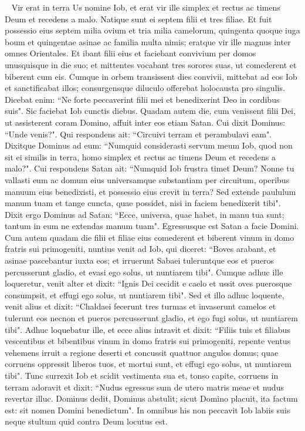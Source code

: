 
\begin{biblechapter}   
\verse Vir erat in terra Us nomine Iob, et erat vir ille simplex et rectus ac timens Deum et recedens a malo. 
\verse Natique sunt ei septem filii et tres filiae. 
\verse Et fuit possessio eius septem milia ovium et tria milia camelorum, quingenta quoque iuga boum et quingentae asinae ac familia multa nimis; eratque vir ille magnus inter omnes Orientales. 
\verse Et ibant filii eius et faciebant convivium per domos unusquisque in die suo; et mittentes vocabant tres sorores suas, ut comederent et biberent cum eis.  
\verse Cumque in orbem transissent dies convivii, mittebat ad eos Iob et sanctificabat illos; consurgensque diluculo offerebat holocausta pro singulis. Dicebat enim: “Ne forte peccaverint filii mei et benedixerint Deo in cordibus suis". Sic faciebat Iob cunctis diebus. 
\verse Quadam autem die, cum venissent filii Dei, ut assisterent coram Domino, affuit inter eos etiam Satan. 
\verse Cui dixit Dominus: “Unde venis?". Qui respondens ait: “Circuivi terram et perambulavi eam". 
\verse Dixitque Dominus ad eum: “Numquid considerasti servum meum Iob, quod non sit ei similis in terra, homo simplex et rectus ac timens Deum et recedens a malo?". 
\verse Cui respondens Satan ait: “Numquid Iob frustra timet Deum? 
\verse Nonne tu vallasti eum ac domum eius universamque substantiam per circuitum, operibus manuum eius benedixisti, et possessio eius crevit in terra? 
\verse Sed extende paululum manum tuam et tange cuncta, quae possidet, nisi in faciem benedixerit tibi". 
\verse Dixit ergo Dominus ad Satan: “Ecce, universa, quae habet, in manu tua sunt; tantum in eum ne extendas manum tuam". Egressusque est Satan a facie Domini. 
\verse Cum autem quadam die filii et filiae eius comederent et biberent vinum in domo fratris sui primogeniti, 
\verse nuntius venit ad Iob, qui diceret: “Boves arabant, et asinae pascebantur iuxta eos; 
\verse et irruerunt Sabaei tuleruntque eos et pueros percusserunt gladio, et evasi ego solus, ut nuntiarem tibi". 
\verse Cumque adhuc ille loqueretur, venit alter et dixit: “Ignis Dei cecidit e caelo et ussit oves puerosque consumpsit, et effugi ego solus, ut nuntiarem tibi". 
\verse Sed et illo adhuc loquente, venit alius et dixit: “Chaldaei fecerunt tres turmas et invaserunt camelos et tulerunt eos necnon et pueros percusserunt gladio, et ego fugi solus, ut nuntiarem tibi". 
\verse Adhuc loquebatur ille, et ecce alius intravit et dixit: “Filiis tuis et filiabus vescentibus et bibentibus vinum in domo fratris sui primogeniti, 
\verse repente ventus vehemens irruit a regione deserti et concussit quattuor angulos domus; quae corruens oppressit liberos tuos, et mortui sunt, et effugi ego solus, ut nuntiarem tibi". 
\verse Tunc surrexit Iob et scidit vestimenta sua et, tonso capite, corruens in terram adoravit 
\verse et dixit: “Nudus egressus sum de utero matris meae et nudus revertar illuc. Dominus dedit, Dominus abstulit; sicut Domino placuit, ita factum est: sit nomen Domini benedictum". 
\verse In omnibus his non peccavit Iob labiis suis neque stultum quid contra Deum locutus est. 
\end{biblechapter}

